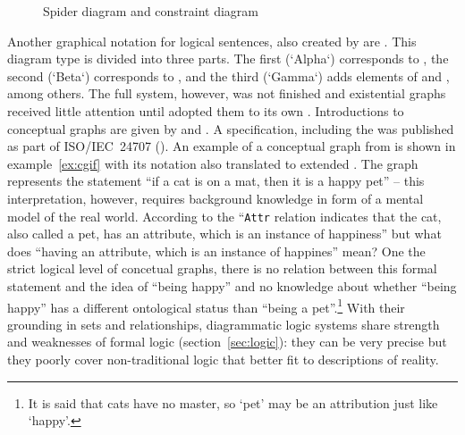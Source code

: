 \begin{figure}
\centering
{}
\caption{Spider diagram and constraint diagram}
\label{fig:spiderdiagram}
\end{figure}

Another graphical notation for logical sentences, also created by
\textcite{Peirce1933} are . This
diagram type is divided into three parts.  The first (`Alpha`) corresponds to
, the second (`Beta`) corresponds to
, and the third (`Gamma`) adds elements of
 and , among others. The full
system, however, was not finished and existential graphs received little
attention until \textcite{Sowa1976} adopted them to its own .  Introductions to conceptual graphs are given by
\cite{Sowa1992,Sowa2008} and \textcite{Dau2009a}. A specification, including the
 was published as part of
ISO/IEC~24707 (\citeyear{ISO24707:2007}). An example of a conceptual graph from
\textcite{Sowa2008} is shown in example~\ref{ex:cgif} with its notation also
translated to extended .  The graph represents the statement ``if a
cat is on a mat, then it is a happy pet'' -- this interpretation, however,
requires background knowledge in form of a mental model of the real world.
According to \textcite{Sowa2008} the ``\texttt{Attr} relation indicates that
the cat, also called a pet, has an attribute, which is an instance of
happiness'' but what does ``having an attribute, which is an instance of
happines'' mean? One the strict logical level of concetual graphs, there is no
relation between this formal statement and the idea of ``being happy'' and no
knowledge about whether ``being happy'' has a different ontological status than
``being a pet''.\footnote{It is said that cats have no master, so `pet' may be
an attribution just like `happy'.} With their grounding in sets and
relationships, diagrammatic logic systems share strength and weaknesses of
formal logic (section~\ref{sec:logic}): they can be very precise but they
poorly cover non-traditional logic that better fit to descriptions of reality.

